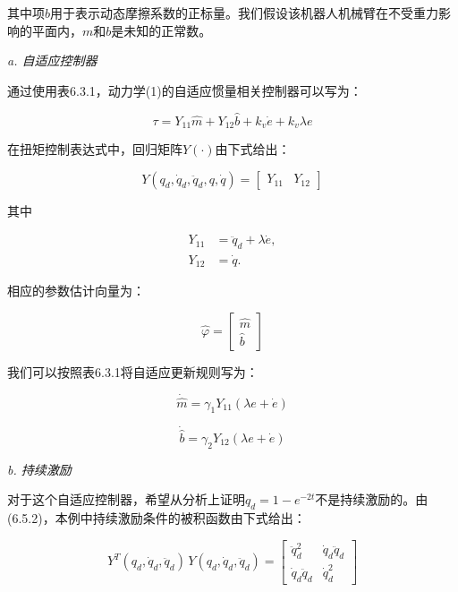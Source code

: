 \documentclass[12pt,a4paper]{ctexart}
\begin{document}
其中项$b$用于表示动态摩擦系数的正标量。我们假设该机器人机械臂在不受重力影响的平面内，$m$和$b$是未知的正常数。

\textit{a. 自适应控制器}

通过使用表6.3.1，动力学(1)的自适应惯量相关控制器可以写为：

\begin{equation}\tag{2}
\tau = Y_{11}\hat{m} + Y_{12}\hat{b} + k_v\dot{e} + k_v\lambda e
\end{equation}

在扭矩控制表达式中，回归矩阵$Y(\cdot)$由下式给出：

\begin{equation}\tag{3}
Y(q_d,\dot{q}_d,\ddot{q}_d,q,\dot{q}) = \begin{bmatrix} Y_{11} & Y_{12} \end{bmatrix}
\end{equation}

其中

\begin{align*}
Y_{11} &= \ddot{q}_d + \lambda\dot{e}, \\
Y_{12} &= \dot{q}.
\end{align*}

相应的参数估计向量为：

\begin{equation}
\hat{\varphi} = \begin{bmatrix} \hat{m} \\ \hat{b} \end{bmatrix}
\end{equation}

我们可以按照表6.3.1将自适应更新规则写为：

\begin{equation}\tag{4}
\dot{\hat{m}} = \gamma_1 Y_{11}(\lambda e + \dot{e})
\end{equation}

\begin{equation}\tag{5}
\dot{\hat{b}} = \gamma_2 Y_{12}(\lambda e + \dot{e})
\end{equation}

\textit{b. 持续激励}

对于这个自适应控制器，希望从分析上证明$q_d = 1 - e^{-2t}$不是持续激励的。由(6.5.2)，本例中持续激励条件的被积函数由下式给出：

\begin{equation}
Y^T(q_d,\dot{q}_d,\ddot{q}_d)\, Y(q_d,\dot{q}_d,\ddot{q}_d) = \begin{bmatrix} \ddot{q}_d^2 & \dot{q}_d\ddot{q}_d \\ \dot{q}_d\ddot{q}_d & \dot{q}_d^2 \end{bmatrix}
\end{equation}
\end{document}
